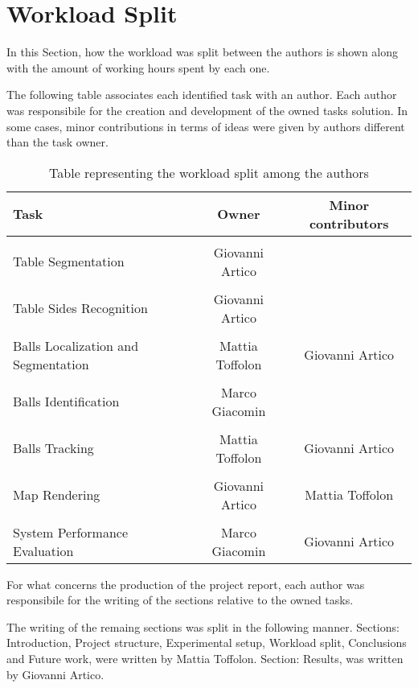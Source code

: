\section{Workload Split}

In this Section, how the workload was split between the authors is shown along with the amount of working hours spent by each one.

The following table associates each identified task with an author. Each author was responsibile for the creation and development of the owned tasks solution.
In some cases, minor contributions in terms of ideas were given by authors different than the task owner.
\begin{table}[h]
\centering
\begin{tabular}{|l|c|c|}
    \hline
    \textbf{Task} & \textbf{Owner} & \textbf{Minor contributors}  \\ \hline
    \\[-1em]
    Table Segmentation  & Giovanni Artico & \\ \hline
    \\[-1em]
    Table Sides Recognition &  Giovanni Artico & \\ \hline
    \\[-1em]
    Balls Localization and Segmentation & Mattia Toffolon & Giovanni Artico\\ \hline
    \\[-1em]
    Balls Identification & Marco Giacomin & \\ \hline
    \\[-1em]
    Balls Tracking & Mattia Toffolon & Giovanni Artico\\ \hline
    \\[-1em]
    Map Rendering & Giovanni Artico & Mattia Toffolon \\ \hline
    \\[-1em]
    System Performance Evaluation & Marco Giacomin & Giovanni Artico \\ \hline
\end{tabular}
\caption{Table representing the workload split among the authors}
\end{table}

\begin{flushleft}
For what concerns the production of the project report, each author was responsibile for the writing of the sections relative to the owned tasks. \\   
\end{flushleft}
The writing of the remaing sections was split in the following manner.
Sections: Introduction, Project structure, Experimental setup, Workload split, Conclusions and Future work, were written by Mattia Toffolon. 
Section: Results, was written by Giovanni Artico. \\

